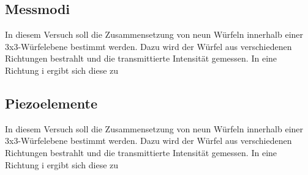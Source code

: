       

      \newpage
      \subsection{Messmodi}
          In diesem Versuch soll die Zusammensetzung von neun Würfeln innerhalb einer 3x3-Würfelebene bestimmt werden. Dazu wird der Würfel aus verschiedenen Richtungen bestrahlt und die transmittierte 
          Intensität gemessen. In eine Richtung i ergibt sich diese zu

      
      
      
      \newpage
      \subsection{Piezoelemente}
          In diesem Versuch soll die Zusammensetzung von neun Würfeln innerhalb einer 3x3-Würfelebene bestimmt werden. Dazu wird der Würfel aus verschiedenen Richtungen bestrahlt und die transmittierte 
          Intensität gemessen. In eine Richtung i ergibt sich diese zu



           


